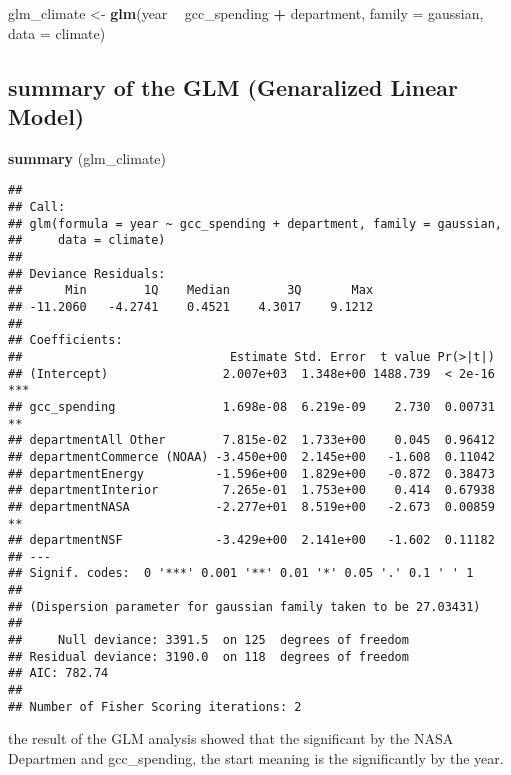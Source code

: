 \documentclass[]{article}
\newenvironment{Shaded}{\begin{snugshade}}{\end{snugshade}}
\newcommand{\KeywordTok}[1]{\textcolor[rgb]{0.13,0.29,0.53}{\textbf{#1}}}
\newcommand{\DataTypeTok}[1]{\textcolor[rgb]{0.13,0.29,0.53}{#1}}
\newcommand{\StringTok}[1]{\textcolor[rgb]{0.31,0.60,0.02}{#1}}
\newcommand{\OperatorTok}[1]{\textcolor[rgb]{0.81,0.36,0.00}{\textbf{#1}}}
\newcommand{\NormalTok}[1]{#1}
\begin{document}
\begin{Shaded}
\begin{Highlighting}[]
\NormalTok{glm_climate <-}\StringTok{ }\KeywordTok{glm}\NormalTok{(year }\OperatorTok{~}\StringTok{ }\NormalTok{gcc_spending }\OperatorTok{+}\StringTok{ }\NormalTok{department, }\DataTypeTok{family =}\NormalTok{ gaussian, }\DataTypeTok{data =}\NormalTok{ climate)}
\end{Highlighting}
\end{Shaded}

\subsection{summary of the GLM (Genaralized Linear
Model)}\label{summary-of-the-glm-genaralized-linear-model}

\begin{Shaded}
\begin{Highlighting}[]
\KeywordTok{summary}\NormalTok{ (glm_climate)}
\end{Highlighting}
\end{Shaded}

\begin{verbatim}
## 
## Call:
## glm(formula = year ~ gcc_spending + department, family = gaussian, 
##     data = climate)
## 
## Deviance Residuals: 
##      Min        1Q    Median        3Q       Max  
## -11.2060   -4.2741    0.4521    4.3017    9.1212  
## 
## Coefficients:
##                             Estimate Std. Error  t value Pr(>|t|)    
## (Intercept)                2.007e+03  1.348e+00 1488.739  < 2e-16 ***
## gcc_spending               1.698e-08  6.219e-09    2.730  0.00731 ** 
## departmentAll Other        7.815e-02  1.733e+00    0.045  0.96412    
## departmentCommerce (NOAA) -3.450e+00  2.145e+00   -1.608  0.11042    
## departmentEnergy          -1.596e+00  1.829e+00   -0.872  0.38473    
## departmentInterior         7.265e-01  1.753e+00    0.414  0.67938    
## departmentNASA            -2.277e+01  8.519e+00   -2.673  0.00859 ** 
## departmentNSF             -3.429e+00  2.141e+00   -1.602  0.11182    
## ---
## Signif. codes:  0 '***' 0.001 '**' 0.01 '*' 0.05 '.' 0.1 ' ' 1
## 
## (Dispersion parameter for gaussian family taken to be 27.03431)
## 
##     Null deviance: 3391.5  on 125  degrees of freedom
## Residual deviance: 3190.0  on 118  degrees of freedom
## AIC: 782.74
## 
## Number of Fisher Scoring iterations: 2
\end{verbatim}

the result of the GLM analysis showed that the significant by the NASA
Departmen and gcc\_spending, the start meaning is the significantly by
the year.
\end{document}
